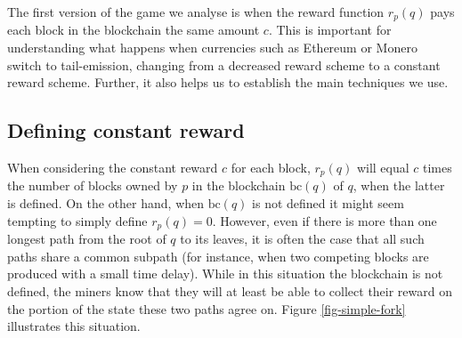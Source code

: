 \documentclass[a4paper,english,cleveref, autoref,numberwithinsect]{lipics-v2019}
\newcommand{\bchain}{\text{bc}}
\begin{document}
The first version of the game we analyse is when the reward function $r_p(q)$ pays each block in the blockchain the same amount $c$. This is important for understanding what happens 
when currencies such as Ethereum or Monero switch to tail-emission, changing from a decreased reward scheme to a constant reward scheme. Further, it also helps us to establish the main techniques we use. 


\subsection{Defining constant reward}
When considering the constant reward $c$ for each block, $r_p(q)$ will equal $c$ times the number of blocks owned by $p$ in the blockchain $\bchain(q)$ of $q$, when the latter is defined. On the other hand, when $\bchain(q)$ is not defined it might seem tempting to simply define $r_p(q) = 0$. However, even if there is more than one longest path from the root of $q$ to its leaves, it is often the case that all such paths share a common subpath (for instance, when two competing blocks are produced with a small time delay). 
While in this situation the blockchain is not defined, the miners know that they will at least be able to collect their reward on the portion of the state these two paths agree on. Figure \ref{fig-simple-fork} illustrates this situation. 
\end{document}
